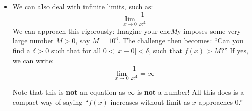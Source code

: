 \begin{itemize}
    \item We can also deal with infinite limits, such as:
    \begin{equation}
        \lim_{x\to 0} \frac{1}{x^4}
        \label{eq:}
    \end{equation}
    We can approach this rigorously: Imagine your ene$M$y imposes some very large number $M>0$, say $M=10^6$. The challenge then becomes: ``Can you find a $\delta>0$ such that for all $0<|x-0|<\delta$, such that $f(x)>M$?'' If yes, we can write:
    \begin{equation}
        \lim_{x\to 0}\frac{1}{x^4} = \infty
        \label{eq:}
    \end{equation}
    \begin{warning}
        Note that this is \textbf{not} an equation as $\infty$ is \textbf{not} a number! All this does is a compact way of saying ``$f(x)$ increases without limit as $x$ approaches $0$.''
    \end{warning}
    
\end{itemize}
